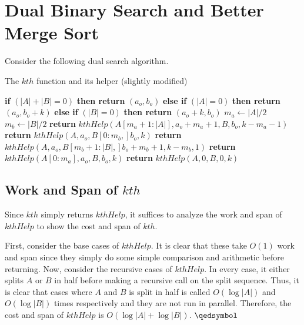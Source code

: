 \chapter{Dual Binary Search and Better Merge Sort}

Consider the following dual search algorithm.

\begin{algorithm}
\caption{The $kth$ function and its helper (slightly modified)}
\begin{algorithmic}[1]

	\State \textbf{if} $(|A| + |B| = 0)$ \textbf{then return} $(a_o, b_o)$
	\State \textbf{else if} $(|A| = 0)$ \textbf{then return} $(a_o, b_o + k)$
	\State \textbf{else if} $(|B| = 0)$ \textbf{then return} $(a_o + k, b_o)$
	\State 
	\State $m_a \gets |A| / 2$
	\State $m_b \gets |B| / 2$
			\State \textbf{return} $kthHelp(A[m_a + 1:|A|], a_o + m_a + 1, B, b_o, k - m_a - 1)$
		\EndCase
			\State \textbf{return} $kthHelp(A, a_o, B[0:m_b,] b_o, k)$
		\EndCase
			\State \textbf{return} $kthHelp(A, a_o, B[m_b + 1:|B|,] b_o + m_b + 1, k-m_b, 1)$
		\EndCase
			\State \textbf{return} $kthHelp(A[0:m_a], a_o, B, b_o, k)$
		\EndCase
	\EndSwitch
\EndProcedure
\State
{}
	\State \textbf{return} $kthHelp(A, 0, B, 0, k)$
\EndProcedure

\end{algorithmic}
\end{algorithm}

\section{Work and Span of $kth$}

Since $kth$ simply returns $kthHelp$, it suffices to analyze the work and span of $kthHelp$ to show the cost and span of $kth$.

First, consider the base cases of $kthHelp$. It is clear that these take $O(1)$ work and span since they simply do some simple comparison and arithmetic before returning. Now, consider the recursive cases of $kthHelp$. In every case, it either splits $A$ or $B$ in half before making a recursive call on the split sequence. Thus, it is clear that cases where $A$ and $B$ is split in half is called $O(\log |A|)$ and $O(\log |B|)$ times respectively and they are not run in parallel. Therefore, the cost and span of $kthHelp$ is $O(\log |A| + \log |B|)$. $\qedsymbol$

